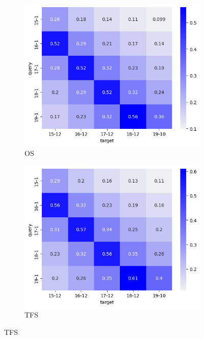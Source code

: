 \begin{figure}[h]
    \centering
    \begin{subfigure}{0.48\linewidth}
    \includegraphics[width=\linewidth]{stylometryExtensions/figures/heat/os.png}
    \caption{OS}
    \label{fig:tempral_vary:os}
    \end{subfigure}
    \begin{subfigure}{0.48\linewidth}
    \includegraphics[width=\linewidth]{stylometryExtensions/figures/heat/tfs.png}
    \caption{TFS}
    \label{fig:tempral_vary:tfs}
    \end{subfigure}
    

\end{figure}
